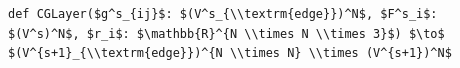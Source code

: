 \documentclass[border=10pt]{standalone}
\begin{document}
\begin{lstlisting}
def CGLayer($g^s_{ij}$: $(V^s_{\\textrm{edge}})^N$, $F^s_i$: $(V^s)^N$, $r_i$: $\mathbb{R}^{N \\times N \\times 3}$) $\to$ $(V^{s+1}_{\\textrm{edge}})^{N \\times N} \\times (V^{s+1})^N$
\end{lstlisting}
\end{document}
